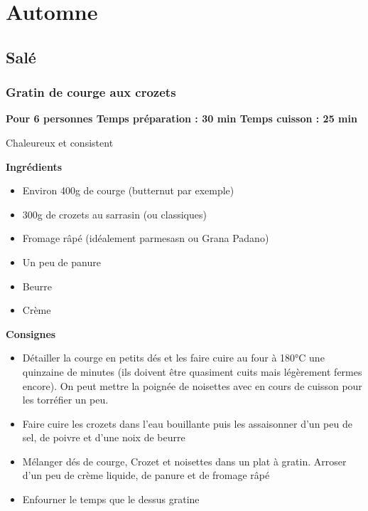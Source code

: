 \documentclass[]{book}
\providecommand{\tightlist}{%
  \setlength{\itemsep}{0pt}\setlength{\parskip}{0pt}}
\begin{document}
\chapter*{Automne}\label{automne}

\section*{Salé}\label{saluxe9-3}

\subsection*{\texorpdfstring{{Gratin de courge aux
crozets}}{Gratin de courge aux crozets}}\label{gratin-de-courge-aux-crozets}

\begin{salebox}
\textbf{Pour 6 personnes \textbar{} Temps préparation : 30 min
\textbar{} Temps cuisson : 25 min}

Chaleureux et consistent
\end{salebox}

 \textbf{Ingrédients}

\begin{itemize}
\tightlist
\item
  Environ 400g de courge (butternut par exemple)
\item
  300g de crozets au sarrasin (ou classiques)
\item
  Fromage râpé (idéalement parmesasn ou Grana Padano)
\item
  Un peu de panure
\item
  Beurre
\item
  Crème
\end{itemize}

\textbf{Consignes}

\begin{itemize}
\tightlist
\item
  Détailler la courge en petits dés et les faire cuire au four à 180°C
  une quinzaine de minutes (ils doivent être quasiment cuits mais
  légèrement fermes encore). On peut mettre la poignée de noisettes avec
  en cours de cuisson pour les torréfier un peu.
\item
  Faire cuire les crozets dans l'eau bouillante puis les assaisonner
  d'un peu de sel, de poivre et d'une noix de beurre
\item
  Mélanger dés de courge, Crozet et noisettes dans un plat à gratin.
  Arroser d'un peu de crème liquide, de panure et de fromage râpé
\item
  Enfourner le temps que le dessus gratine
\end{itemize}
\end{document}
